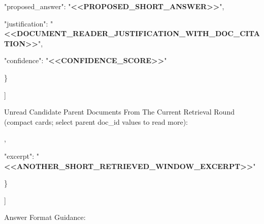 \begin{tcolorbox}
\begin{scriptsize}
    "proposed\_answer": "\textcolor{my-green}{\textbf{\textless{}\textless{}PROPOSED\_SHORT\_ANSWER\textgreater{}\textgreater{}}}",\par
    "justification": "\textcolor{my-green}{\textbf{\textless{}\textless{}DOCUMENT\_READER\_JUSTIFICATION\_WITH\_DOC\_CITATION\textgreater{}\textgreater{}}}",\par
    "confidence": "\textcolor{my-green}{\textbf{\textless{}\textless{}CONFIDENCE\_SCORE\textgreater{}\textgreater{}}}"\par
  \}\par
]\par
\mbox{}\par
Unread Candidate Parent Documents From The Current Retrieval Round (compact cards; select parent doc\_id values to read more):\par
[\par
  \{\par
    "doc\_id": "\textcolor{my-green}{\textbf{\textless{}\textless{}SECOND\_CANDIDATE\_PARENT\_DOC\_ID\textgreater{}\textgreater{}}}",\par
    "source": "\textcolor{my-green}{\textbf{\textless{}\textless{}LOCAL\_OR\_WEB\textgreater{}\textgreater{}}}",\par
    "title": "\textcolor{my-green}{\textbf{\textless{}\textless{}SECOND\_CANDIDATE\_DOCUMENT\_TITLE\textgreater{}\textgreater{}}}",\par
    "matched\_window\_count": "\textcolor{my-green}{\textbf{\textless{}\textless{}N\_MATCHED\_WINDOWS\textgreater{}\textgreater{}}}",\par
    "total\_window\_count": "\textcolor{my-green}{\textbf{\textless{}\textless{}N\_TOTAL\_WINDOWS\textgreater{}\textgreater{}}}",\par
    "best\_rank": "\textcolor{my-green}{\textbf{\textless{}\textless{}BEST\_RETRIEVAL\_RANK\textgreater{}\textgreater{}}}",\par
    "top\_queries": [\par
      "\textcolor{my-green}{\textbf{\textless{}\textless{}ANOTHER\_RETRIEVAL\_QUERY\textgreater{}\textgreater{}}}"\par
    ],\par
    "excerpt": "\textcolor{my-green}{\textbf{\textless{}\textless{}ANOTHER\_SHORT\_RETRIEVED\_WINDOW\_EXCERPT\textgreater{}\textgreater{}}}"\par
  \}\par
]\par
\mbox{}\par
Answer Format Guidance:\par

\end{scriptsize}
\end{tcolorbox}
